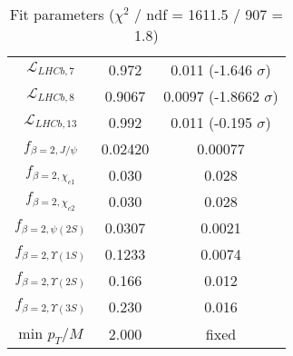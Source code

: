 \begin{table}[h!]
\begin{tabular}{c|c|c}
$\mathcal L_{LHCb,7}$ & 0.972 & 0.011 (-1.646 $\sigma$) \\
$\mathcal L_{LHCb,8}$ & 0.9067 & 0.0097 (-1.8662 $\sigma$) \\
$\mathcal L_{LHCb,13}$ & 0.992 & 0.011 (-0.195 $\sigma$) \\
$f_{\beta=2,J/\psi}$ & 0.02420 & 0.00077 \\
$f_{\beta=2,\chi_{c1}}$ & 0.030 & 0.028 \\
$f_{\beta=2,\chi_{c2}}$ & 0.030 & 0.028 \\
$f_{\beta=2,\psi(2S)}$ & 0.0307 & 0.0021 \\
$f_{\beta=2,\Upsilon(1S)}$ & 0.1233 & 0.0074 \\
$f_{\beta=2,\Upsilon(2S)}$ & 0.166 & 0.012 \\
$f_{\beta=2,\Upsilon(3S)}$ & 0.230 & 0.016 \\
min $p_T/M$ & 2.000 & fixed \\
\end{tabular}
\caption{Fit parameters ($\chi^2$ / ndf = 1611.5 / 907 = 1.8)}
\end{table}
